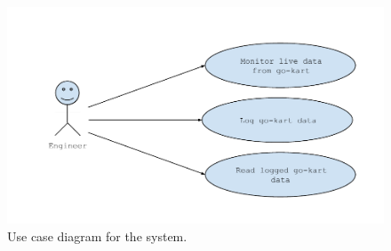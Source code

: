 \begin{figure}[h]
 	\centering
    \includegraphics[width=1\textwidth]{graphics/use_cases}
    \caption{Use case diagram for the system.}
    \label{fig:usecases}
\end{figure}